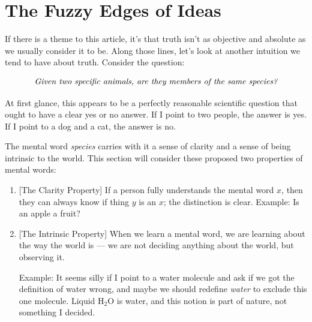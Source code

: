 \documentclass[11pt, oneside]{article}   	%
\begin{document}
\section{The Fuzzy Edges of Ideas}

If there is a theme to this article, it's that truth isn't as
objective and absolute as we usually consider it to be.
Along those lines, let's
look at another intuition we tend to have about truth.
Consider the question:

\begin{equation}\label{eq4}
    \text{\em Given two specific animals, are they members of the same
    species?}
\end{equation}

At first glance, this appears to be a perfectly reasonable scientific question
that ought to have a clear yes or no answer. If I point to two people, the
answer is yes. If I point to a dog and a cat, the answer is no.

The mental word {\em species} carries with it a sense of clarity and a
sense of being intrinsic to the world.
This section will consider
these proposed two properties of mental words:
\begin{enumerate}
    \item{} [The Clarity Property]
        If a person fully understands the mental word $x$,
        then they can always know if thing $y$ is an $x$;
        the distinction is clear.
        Example: Is an apple a fruit?
    \item{} [The Intrinsic Property]
        When we learn a mental word, we are learning about the way the world
        is --- we are not deciding anything about the world, but observing it.

        Example: It seems silly if I point to a water molecule and ask if we got
        the definition of water wrong, and maybe we should redefine {\em water}
        to exclude this one molecule.
        Liquid H$_2$O is water, and this notion is part
        of nature, not something I decided.
\end{enumerate}




\end{document}
